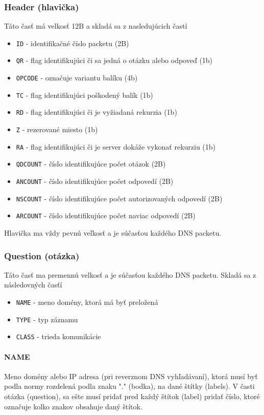 \documentclass[titlepage]{article}
\begin{document}
\subsubsection{Header (hlavička)}
Táto časť má velkosť 12B a skladá sa z nasledujúcich častí
\begin{itemize}
    \item \verb|ID| - identifikačné číslo packetu (2B)
    \item \verb|QR| - flag identifikujúci či sa jedná o otázku alebo odpoveď (1b)
    \item \verb|OPCODE| - označuje variantu balíku (4b)
    \item \verb|TC| - flag identifikujúci poškodený balík (1b)
    \item \verb|RD| - flag identifikujúci či je vyžiadaná rekurzia (1b)
    \item \verb|Z| - rezerované miesto (1b)
    \item \verb|RA| - flag identifikujúci či je server dokáže vykonať rekurziu (1b)
    \item \verb|QDCOUNT| - číslo identifikujúce počet otázok (2B)
    \item \verb|ANCOUNT| - číslo identifikujúce počet odpovedí (2B)
    \item \verb|NSCOUNT| - číslo identifikujúce počet autorizovaných odpovedí (2B)
    \item \verb|ARCOUNT| - číslo identifikujúce počet naviac odpovedí (2B)
\end{itemize}
Hlavička ma vždy pevnú veľkosť a je súčasťou každého DNS packetu.

\subsubsection{Question (otázka)}
Táto časť ma premennú velkosť a je súčasťou každého DNS packetu.
Skladá sa z následovných časťí
\begin{itemize}
    \item \verb|NAME| - meno domény, ktorá má byť preložená
    \item \verb|TYPE| - typ záznamu
    \item \verb|CLASS| - trieda komunikácie
\end{itemize}

\paragraph{NAME}
Meno domény alebo IP adresa (pri reverznom DNS vyhľadávaní), ktorá musí byť podla
normy rozdelená podla znaku "." (bodka), na dané štítky (labels). V časti otázka (question),
sa ešte musí pridať pred každý štítok (label) pridať číslo, ktoré označuje kolko znakov
obsahuje daný štítok.
\end{document}
